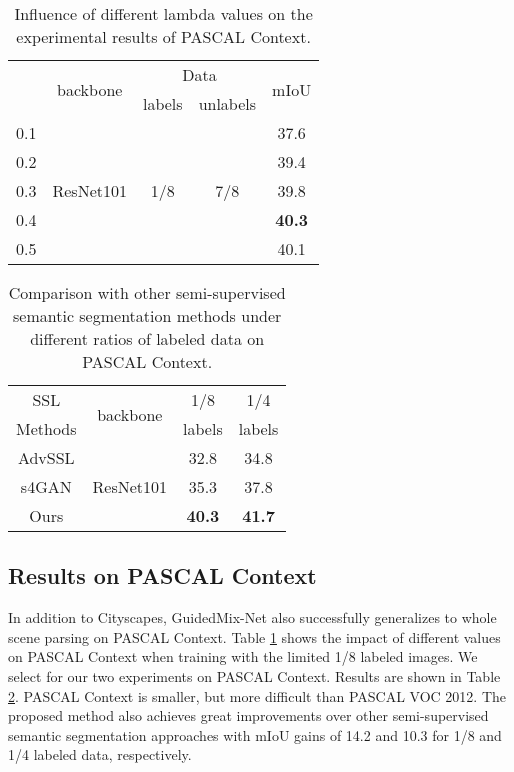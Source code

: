 \begin{table}[h]
\small
\centering
\caption{Influence of different lambda values on the experimental results of PASCAL Context.}
\begin{tabular}{c|c|c|c|c}
\hline 
\multirow{2}{*}{} & \multirow{2}{*}{backbone} & \multicolumn{2}{c|}{Data} & \multirow{2}{*}{mIoU} \\\cline{3-4}
						&      &  labels   & unlabels        &                       \\\hline
 0.1 & \multirow{5}{*}{ResNet101} & \multirow{5}{*}{1/8} & \multirow{5}{*}{7/8} & 37.6\\
 0.2 &  &  &      & 39.4 \\
 0.3 &  &  &      & 39.8 \\
 0.4 &  &  &      & \textbf{40.3} \\
 0.5 &  &  &      & 40.1 \\\hline
\end{tabular}
\label{impact_lambda_context}
\end{table}
\begin{table}[h]
\small
\centering
\caption{Comparison with other semi-supervised semantic segmentation methods under different ratios of labeled data on PASCAL Context.}
\begin{tabular}{c|c|c|c}
\hline
	SSL & \multirow{2}{*}{backbone} & 1/8 & 1/4 \\
	Methods & & labels & labels \\\hline
	AdvSSL \cite{2018Adversarial} & \multirow{3}{*}{ResNet101} & 32.8 & 34.8\\
	s4GAN \cite{mittal2019semi} &  & 35.3 & 37.8 \\
	Ours & & \textbf{40.3} & \textbf{41.7} \\\hline
\end{tabular}
\label{the experiments of context}
\end{table}


\subsection{Results on PASCAL Context}
In addition to Cityscapes, GuidedMix-Net also successfully generalizes to whole scene parsing on PASCAL Context. 
Table \ref{impact_lambda_context} shows the impact of different  values on PASCAL Context when training with the limited 1/8 labeled images.
We select   for our two experiments on PASCAL Context.
Results are shown in Table \ref{the experiments of context}.
PASCAL Context is smaller, but more difficult than PASCAL VOC 2012. 
The proposed method also achieves great improvements over other semi-supervised semantic segmentation approaches with mIoU gains of 14.2 and 10.3 for 1/8 and 1/4 labeled data, respectively.

